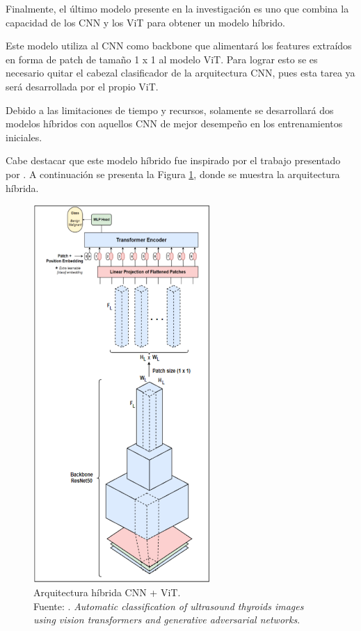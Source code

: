 Finalmente, el último modelo presente en la investigación es uno que combina la capacidad de los CNN y los ViT para obtener un modelo híbrido.

Este modelo utiliza al CNN como backbone que alimentará los features extraídos en forma de patch de tamaño 1 x 1 al modelo ViT. Para lograr esto se es necesario quitar el cabezal clasificador de la arquitectura CNN, pues esta tarea ya será desarrollada por el propio ViT.

Debido a las limitaciones de tiempo y recursos, solamente se desarrollará dos modelos híbridos con aquellos CNN de mejor desempeño en los entrenamientos iniciales.

Cabe destacar que este modelo híbrido fue inspirado por el trabajo presentado por \cite{pr_JERBI2023autoclassViTGAN}. A continuación se presenta la Figura \ref{4:fig101}, donde se muestra la arquitectura híbrida.

\begin{figure}[H]
	\begin{center}
		\includegraphics[width=0.60\textwidth]{4/figures/hybrid_arc.png}
		\caption[Arquitectura híbrida CNN + ViT]{Arquitectura híbrida CNN + ViT. \\
		Fuente: \cite{pr_JERBI2023autoclassViTGAN}. \textit{Automatic classification of ultrasound thyroids images using vision transformers and generative adversarial networks}.}
		\label{4:fig101}
	\end{center}
\end{figure}


